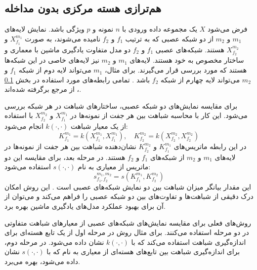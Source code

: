 \subsection{
	هم‌ترازی هسته مرکزی بدون مداخله%
}\label{sec_dCKA}
فرض می‌شود \(X\) یک مجموعه داده ورودی با \(n\) نمونه و \(p\) ویژگی باشد. نمایش‌ لایه‌های \(m_1\) و \(m_2\) از دو شبکه عصبی که به ترتیب \(f_1\) و \(f_2\) نامیده می‌شوند، به صورت \(X^{m_1}_{f_1}\) و \(X^{m_2}_{f_2}\) هستند. شبکه‌های عصبی \(f_1\) و \(f_2\) دو مدل متفاوت یادگیری ماشین با معماری و ساختار مخصوص به خود هستند. لایه‌های \(m_1\) و \(m_2\) نیز لایه‌های خاصی در این شبکه‌ها هستند که مورد بررسی قرار می‌گیرند. برای مثال، \(m_1\) می‌تواند لایه دوم از شبکه \(f_1\) و \(m_2\) می‌تواند لایه چهارم از شبکه \(f_2\) باشد
\cite{cui2022deconfounded}.
تمامی رابطه‌های مورد استفاده در بخش
\ref{sec_dCKA}%
، از مرجع 
\cite{cui2022deconfounded} 
برگرفته شده‌اند.

برای مقایسه نمایش‌های دو شبکه عصبی، ساختارهای شباهت در هر شبکه بررسی می‌شود. این کار با محاسبه شباهت بین هر جفت از نمونه‌ها در \(X^{m_1}_{f_1}\) و \(X^{m_2}_{f_2}\) با استفاده از یک معیار شباهت \( k(\cdot, \cdot) \) انجام می‌شود:
\begin{equation}
	K^{m_1}_{f_1} = k(X^{m_1}_{f_1}, X^{m_1}_{f_1}), \quad K^{m_2}_{f_2} = k(X^{m_2}_{f_2}, X^{m_2}_{f_2})
	\label{eq_dCKA_Kernel}
\end{equation}
در این رابطه ماتریس‌های \(K^{m_1}_{f_1}\) و \(K^{m_2}_{f_2}\) نشان‌دهنده شباهت بین هر جفت از نمونه‌ها در لایه‌های \(m_1\) و \(m_2\) از شبکه‌های \(f_1\) و \(f_2\) هستند. در مرحله بعد، برای مقایسه این دو ماتریس از معیاری به نام \(s(\cdot, \cdot)\) استفاده می‌شود:
\begin{equation}
	s^{m_1,m_2}_{f_1,f_2} = s(K^{m_1}_{f_1}, K^{m_2}_{f_2})
	\label{eq_similarity}
\end{equation}
این مقدار بیانگر میزان شباهت بین دو نمایش شبکه‌های عصبی است
\cite{cui2022deconfounded}.
این روش امکان درک دقیقی از شباهت‌ها و تفاوت‌های بین دو شبکه عصبی را فراهم می‌کند و می‌توان از آن برای بهبود عملکرد مدل‌های یادگیری ماشین بهره برد.

روش‌های فعلی برای مقایسه نمایش‌های شبکه‌های عصبی از معیارهای شباهت متفاوتی در دو مرحله استفاده می‌کنند. برای مثال روش
در مرحله اول از یک تابع هسته‌ای برای اندازه‌گیری شباهت استفاده می‌کند که با \( k(\cdot,\cdot) \) نشان داده می‌شود. در مرحله دوم، برای اندازه‌گیری شباهت بین تابع‌های هسته‌ای از معیاری به نام
که با \( s(\cdot,\cdot) \) نشان داده می‌شود، بهره می‌برد.


